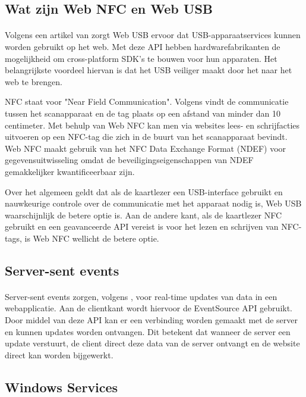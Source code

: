 \bigskip
\subsection{Wat zijn Web NFC en Web USB}
\paragraph{}
Volgens een artikel van \textcite{FrançoisBeaufortUSB} zorgt Web USB ervoor dat USB-apparaatservices kunnen worden gebruikt op het web. Met deze API hebben hardwarefabrikanten de mogelijkheid om cross-platform SDK's te bouwen voor hun apparaten. Het belangrijkste voordeel hiervan is dat het USB veiliger maakt door het naar het web te brengen.

NFC staat voor "Near Field Communication". Volgens \textcite{FrançoisBeaufortNFC} vindt de communicatie tussen het scanapparaat en de tag plaats op een afstand van minder dan 10 centimeter. Met behulp van Web NFC kan men via websites lees- en schrijfacties uitvoeren op een NFC-tag die zich in de buurt van het scanapparaat bevindt. Web NFC maakt gebruik van het NFC Data Exchange Format (NDEF) voor gegevensuitwisseling omdat de beveiligingseigenschappen van NDEF gemakkelijker kwantificeerbaar zijn.

Over het algemeen geldt dat als de kaartlezer een USB-interface gebruikt en nauwkeurige controle over de communicatie met het apparaat nodig is, Web USB waarschijnlijk de betere optie is. Aan de andere kant, als de kaartlezer NFC gebruikt en een geavanceerde API vereist is voor het lezen en schrijven van NFC-tags, is Web NFC wellicht de betere optie.

\bigskip
\subsection{Server-sent events}
\paragraph{}
Server-sent events zorgen, volgens \textcite{DigitalOceanSSE}, voor real-time updates van data in een webapplicatie. Aan de clientkant wordt hiervoor de EventSource API gebruikt. Door middel van deze API kan er een verbinding worden gemaakt met de server en kunnen updates worden ontvangen. Dit betekent dat wanneer de server een update verstuurt, de client direct deze data van de server ontvangt en de website direct kan worden bijgewerkt.

\bigskip
\subsection{Windows Services}

